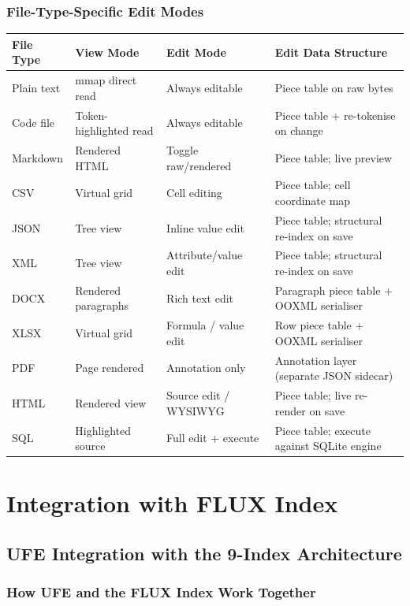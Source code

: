 \documentclass[11pt, a4paper, openright]{report}
\begin{document}
\section{File-Type-Specific Edit Modes}

\begin{longtable}{@{}p{28mm}p{36mm}p{34mm}p{44mm}@{}}
\toprule
\textbf{File Type} & \textbf{View Mode} & \textbf{Edit Mode} & \textbf{Edit Data Structure} \\
\midrule
Plain text & mmap direct read & Always editable & Piece table on raw bytes \\
Code file & Token-highlighted read & Always editable & Piece table + re-tokenise on change \\
Markdown & Rendered HTML & Toggle raw/rendered & Piece table; live preview \\
CSV & Virtual grid & Cell editing & Piece table; cell coordinate map \\
JSON & Tree view & Inline value edit & Piece table; structural re-index on save \\
XML & Tree view & Attribute/value edit & Piece table; structural re-index on save \\
DOCX & Rendered paragraphs & Rich text edit & Paragraph piece table + OOXML serialiser \\
XLSX & Virtual grid & Formula / value edit & Row piece table + OOXML serialiser \\
PDF & Page rendered & Annotation only & Annotation layer (separate JSON sidecar) \\
HTML & Rendered view & Source edit / WYSIWYG & Piece table; live re-render on save \\
SQL & Highlighted source & Full edit + execute & Piece table; execute against SQLite engine \\
\bottomrule
\end{longtable}

\part{Integration with FLUX Index}

\chapter{UFE Integration with the 9-Index Architecture}

\section{How UFE and the FLUX Index Work Together}
\end{document}
